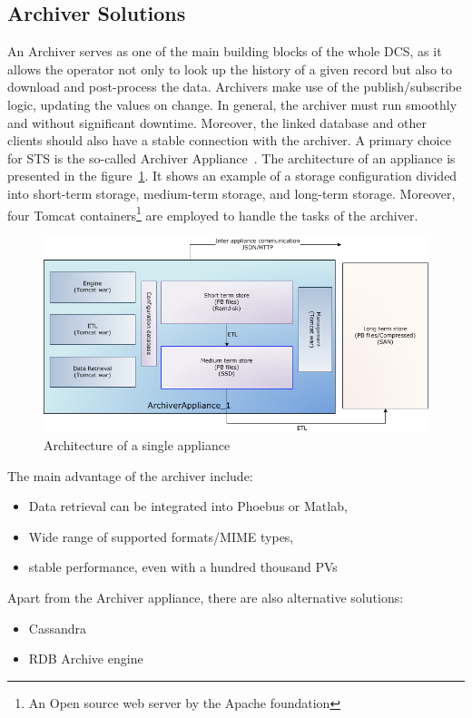\subsection{Archiver Solutions} \label{archiver}
An Archiver serves as one of the main building blocks of the whole \gls{DCS}, as it allows the operator not only to look up the history of a given record but also to download and post-process the data. Archivers make use of the publish/subscribe logic, updating the values on change. In general, the archiver must run smoothly and without significant downtime. Moreover, the linked database and other clients should also have a stable connection with the archiver. A primary choice for STS is the so-called Archiver Appliance~\cite{archiver_appliance}. The architecture of an appliance is presented in the figure~\ref{fig_archiver}. It shows an example of a storage configuration divided into short-term storage, medium-term storage, and long-term storage. Moreover, four Tomcat containers\footnote[1]{An Open source web server by the Apache foundation} are employed to handle the tasks of the archiver.  
\begin{figure}[!h]
\centering
\includegraphics[width=0.7\columnwidth]{Chapter3/DCS/images/applarch.png}
\caption{Architecture of a single appliance \cite{archiver_appliance}}
\label{fig_archiver}
\end{figure}
\newline

The main advantage of the archiver include: 

\begin{itemize}
    \item Data retrieval can be integrated into Phoebus or Matlab,
    \item Wide range of supported formats/MIME types,
    \item stable performance, even with a hundred thousand \gls{PV}s
\end{itemize}
Apart from the Archiver appliance, there are also alternative solutions:

\begin{itemize}
    \item Cassandra \cite{cassandra_archive}
    \item RDB Archive engine \cite{rdb_archive}
\end{itemize}

